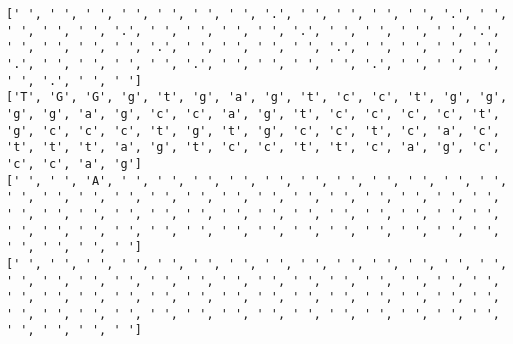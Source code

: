 \documentclass{article}
\begin{document}
\begin{Verbatim}
[' ', ' ', ' ', ' ', ' ', ' ', ' ', '.', ' ', ' ', ' ', ' ', '.', ' ', ' ', ' ', ' ', '.', ' ', ' ', ' ', ' ', '.', ' ', ' ', ' ', ' ', '.', ' ', ' ', ' ', ' ', '.', ' ', ' ', ' ', ' ', '.', ' ', ' ', ' ', ' ', '.', ' ', ' ', ' ', ' ', '.', ' ', ' ', ' ', ' ', '.', ' ', ' ', ' ', ' ', '.', ' ', ' ']
['T', 'G', 'G', 'g', 't', 'g', 'a', 'g', 't', 'c', 'c', 't', 'g', 'g', 'g', 'g', 'a', 'g', 'c', 'c', 'a', 'g', 't', 'c', 'c', 'c', 'c', 't', 'g', 'c', 'c', 'c', 't', 'g', 't', 'g', 'c', 'c', 't', 'c', 'a', 'c', 't', 't', 't', 'a', 'g', 't', 'c', 'c', 't', 't', 'c', 'a', 'g', 'c', 'c', 'c', 'a', 'g']
[' ', ' ', 'A', ' ', ' ', ' ', ' ', ' ', ' ', ' ', ' ', ' ', ' ', ' ', ' ', ' ', ' ', ' ', ' ', ' ', ' ', ' ', ' ', ' ', ' ', ' ', ' ', ' ', ' ', ' ', ' ', ' ', ' ', ' ', ' ', ' ', ' ', ' ', ' ', ' ', ' ', ' ', ' ', ' ', ' ', ' ', ' ', ' ', ' ', ' ', ' ', ' ', ' ', ' ', ' ', ' ', ' ', ' ', ' ', ' ']
[' ', ' ', ' ', ' ', ' ', ' ', ' ', ' ', ' ', ' ', ' ', ' ', ' ', ' ', ' ', ' ', ' ', ' ', ' ', ' ', ' ', ' ', ' ', ' ', ' ', ' ', ' ', ' ', ' ', ' ', ' ', ' ', ' ', ' ', ' ', ' ', ' ', ' ', ' ', ' ', ' ', ' ', ' ', ' ', ' ', ' ', ' ', ' ', ' ', ' ', ' ', ' ', ' ', ' ', ' ', ' ', ' ', ' ', ' ', ' ']
  

\end{Verbatim}
\end{document}
